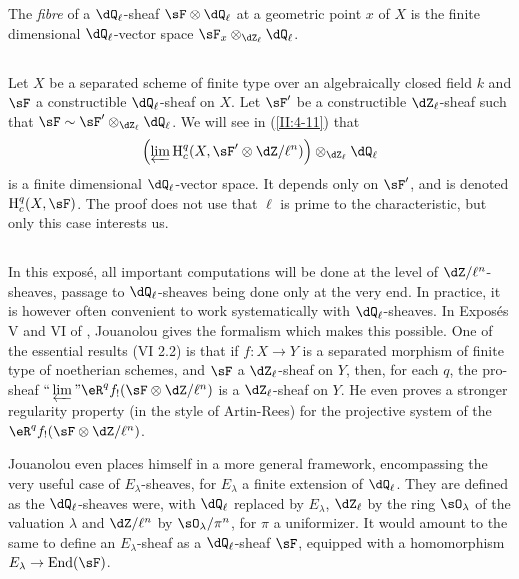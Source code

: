 The \emph{fibre} of a $\dQ_\ell$-sheaf $\sF\otimes\dQ_\ell$ at a
geometric point $x$ of $X$ is the finite dimensional
$\dQ_\ell$-vector space $\sF_x\otimes_{\dZ_\ell}\dQ_\ell$.




\subsection{}\label{II:2-10}

Let $X$ be a separated scheme of finite type over an algebraically
closed field $k$ and $\sF$ a constructible $\dQ_\ell$-sheaf on $X$. Let $\sF'$ be a
constructible $\dZ_\ell$-sheaf such that
$\sF\sim \sF'\otimes_{\dZ_\ell}\dQ_\ell$. We will see in (\ref{II:4-11}) that
\[
  \left(\varprojlim \h_c^q(X,\sF'\otimes \dZ/\ell^n)\right)\otimes_{\dZ_\ell}\dQ_\ell
\]
is a finite dimensional $\dQ_\ell$-vector space. It depends only on
$\sF'$, and is denoted $\h_c^q(X,\sF)$. The proof does not use that $\ell$ is
prime to the characteristic, but only this case interests us.




\subsection{}\label{II:2-11}

In this expos\'e, all important computations will be done at the level of
$\dZ/\ell^n$-sheaves, passage to $\dQ_\ell$-sheaves being done only at the
very end. In practice, it is however often convenient to work
systematically with $\dQ_\ell$-sheaves. In Expos\'es
V and VI of \cite{sga5}, Jouanolou gives the formalism which makes this possible.
One of the essential results (VI 2.2) is that if $f:X\to Y$ is a
separated morphism of finite type of noetherian schemes, and $\sF$ a
$\dZ_\ell$-sheaf on $Y$, then, for each $q$, the pro-sheaf
$\text{``}\varprojlim\text{''}\eR^q f_! (\sF\otimes\dZ/\ell^n)$ is a
$\dZ_\ell$-sheaf on $Y$. He even proves a stronger
regularity property (in the style of Artin-Rees) for the projective system of the
$\eR^q f_!(\sF\otimes\dZ/\ell^n)$.

Jouanolou even places himself in a more general framework, encompassing the
very useful case of $E_\lambda$-sheaves, for $E_\lambda$ a finite extension of
$\dQ_\ell$. They are defined as the $\dQ_\ell$-sheaves were,
with $\dQ_\ell$ replaced by $E_\lambda$, $\dZ_\ell$ by the ring
$\sO_\lambda$ of the valuation $\lambda$ and $\dZ/\ell^n$ by
$\sO_\lambda/\pi^n$, for $\pi$ a uniformizer. It would amount to the same to
define an $E_\lambda$-sheaf as a $\dQ_\ell$-sheaf $\sF$, equipped
with a homomorphism $E_\lambda\to\operatorname{End}(\sF)$.










